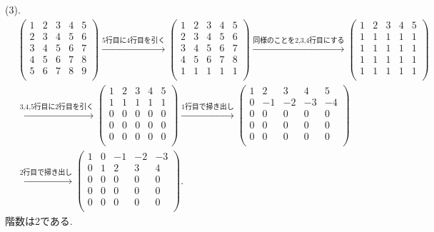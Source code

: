 \documentclass[dvipdfmx,a4paper,11pt]{article}
\theoremstyle{definition}
\begin{document}
(3).
\begin{align*}
 &\begin{pmatrix}
 1& 2& 3  & 4&5\\
 2& 3& 4  & 5&6\\
 3& 4& 5 & 6&7\\
 4& 5& 6 & 7&8\\
 5& 6& 7 & 8&9\\
 \end{pmatrix}
 \overset{\text{5行目に4行目を引く}}{\longrightarrow} 
\begin{pmatrix}
 1& 2& 3  & 4&5\\
 2& 3& 4  & 5&6\\
 3& 4& 5 & 6&7\\
 4& 5& 6 & 7&8\\
 1& 1& 1 & 1&1\\
 \end{pmatrix}
 \overset{\text{同様のことを2,3,4行目にする}}{\longrightarrow} 
\begin{pmatrix}
 1& 2& 3  & 4&5\\
 1& 1& 1 & 1&1\\
  1& 1& 1 & 1&1\\
   1& 1& 1 & 1&1\\
 1& 1& 1 & 1&1\\
 \end{pmatrix} \\
 & \overset{\text{3,4,5行目に2行目を引く}}{\longrightarrow} 
\begin{pmatrix}
 1& 2& 3  & 4&5\\
 1& 1& 1 & 1&1\\
  0&0&0&0& 0\\
    0&0&0&0& 0\\
      0&0&0&0& 0\\
 \end{pmatrix}
\overset{\text{1行目で掃き出し}}{\longrightarrow} 
\begin{pmatrix}
 1& 2& 3  & 4&5\\
 0& -1& -2 & -3&-4\\
 0&0&0&0& 0\\
0&0&0&0& 0\\
0&0&0&0& 0\\
 \end{pmatrix} \\
&\overset{\text{2行目で掃き出し}}{\longrightarrow} 
\begin{pmatrix}
 1& 0& -1  & -2&-3\\
 0& 1& 2 & 3&4\\
 0&0&0&0& 0\\
0&0&0&0& 0\\
0&0&0&0& 0\\
 \end{pmatrix}.
 \end{align*}
階数は2である.
 
\end{document}
